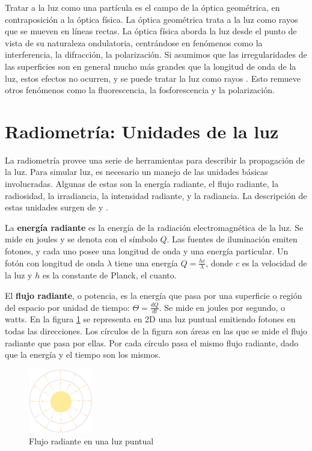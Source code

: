 Tratar a la luz como una partícula es el campo de la óptica geométrica, en contraposición a la óptica física.
La óptica geométrica trata a la luz como rayos que se mueven en líneas rectas.
La óptica física aborda la luz desde el punto de vista de su naturaleza ondulatoria, centrándose en fenómenos como la interferencia, la difracción, la polarización.
Si asumimos que las irregularidades de las superficies son en general mucho más grandes que la longitud de onda de la luz, estos efectos no ocurren, y se puede tratar la luz como rayos \cite{rtr}.
Esto remueve otros fenómenos como la fluorescencia, la fosforescencia y la polarización.


\section{Radiometría: Unidades de la luz}\label{sec:radiometry}

La radiometría provee una serie de herramientas para describir la propagación de la luz.
Para simular luz, es necesario un manejo de las unidades básicas involucradas.
Algunas de estas son la energía radiante, el flujo radiante, la radiosidad, la irradiancia, la intensidad radiante, y la radiancia.
La descripción de estas unidades surgen de \cite{rtr} y \cite{pbr}.

La \textbf{energía radiante} es la energía de la radiación electromagnética de la luz.
Se mide en joules y se denota con el símbolo $Q$.
Las fuentes de iluminación emiten fotones, y cada uno posee una longitud de onda y una energía particular.
Un fotón con longitud de onda $\lambda$ tiene una energía $Q = \frac{hc}{\lambda}$, donde $c$ es la velocidad de la luz y $h$ es la constante de Planck, el cuanto.

El \textbf{flujo radiante}, o potencia, es la energía que pasa por una superficie o región del espacio por unidad de tiempo: $\Theta = \frac{dQ}{dt}$.
Se mide en joules por segundo, o watts.
En la figura \ref{fig:point-light-flux} se representa en 2D una luz puntual emitiendo fotones en todas las direcciones.
Los círculos de la figura son áreas en las que se mide el flujo radiante que pasa por ellas.
Por cada círculo pasa el mismo flujo radiante, dado que la energía y el tiempo son los mismos.

\begin{figure}[ht]
    \centering
    \includegraphics[width=0.25\textwidth]{point-light-flux.png}
    \caption{Flujo radiante en una luz puntual}
    \label{fig:point-light-flux}
\end{figure}


